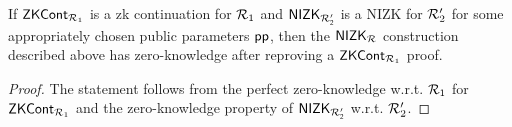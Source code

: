 \begin{lemma} 
	\label{le:specialZK_for_nizkR}
	If ${\mathsf{ZKCont}}_{\mathcal{R}_1}$ is a zk continuation for $\mathcal{R}_1$ and ${\mathsf{NIZK_{\mathcal{R}'_2}}}$ is a NIZK for $\mathcal{R}_2'$ for some appropriately chosen public parameters $\mathsf{pp}$, 
	then the ${\mathsf{NIZK_{\mathcal{R}}}}$ construction described above has zero-knowledge after reproving a ${\mathsf{ZKCont}}_{\mathcal{R}_1}$ proof.
\end{lemma} 
\begin{proof} The statement follows from the perfect zero-knowledge w.r.t. $\mathcal{R}_1$ for ${\mathsf{ZKCont}}_{\mathcal{R}_1}$ and 
	the zero-knowledge property of ${\mathsf{NIZK_{\mathcal{R}'_2}}}$ w.r.t. $\mathcal{R}_2'$.
\end{proof}

